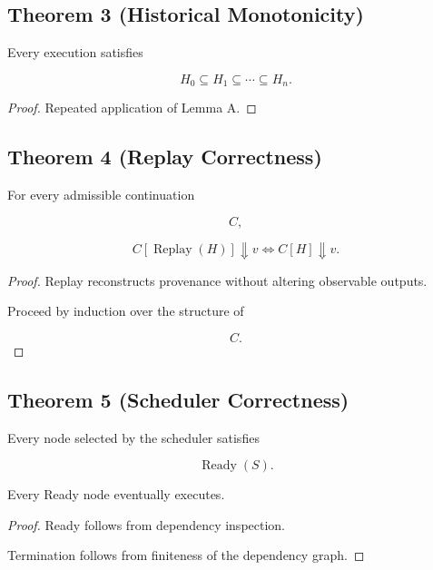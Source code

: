 \documentclass[12pt,oneside]{article}
\theoremstyle{definition}
\theoremstyle{remark}
\begin{document}
\subsection*{Theorem 3 (Historical Monotonicity)}

Every execution satisfies

\[
H_0
\subseteq
H_1
\subseteq
\cdots
\subseteq
H_n.
\]

\begin{proof}

Repeated application of Lemma A.

\end{proof}

\subsection*{Theorem 4 (Replay Correctness)}

For every admissible continuation

\[
C,
\]

\[
C[\operatorname{Replay}(H)]
\Downarrow
v
\Longleftrightarrow
C[H]
\Downarrow
v.
\]

\begin{proof}

Replay reconstructs provenance without altering observable outputs.

Proceed by induction over the structure of

\[
C.
\]

\end{proof}

\subsection*{Theorem 5 (Scheduler Correctness)}

Every node selected by the scheduler satisfies

\[
\operatorname{Ready}(S).
\]

Every Ready node eventually executes.

\begin{proof}

Ready follows from dependency inspection.

Termination follows from finiteness of the dependency graph.

\end{proof}
\end{document}
